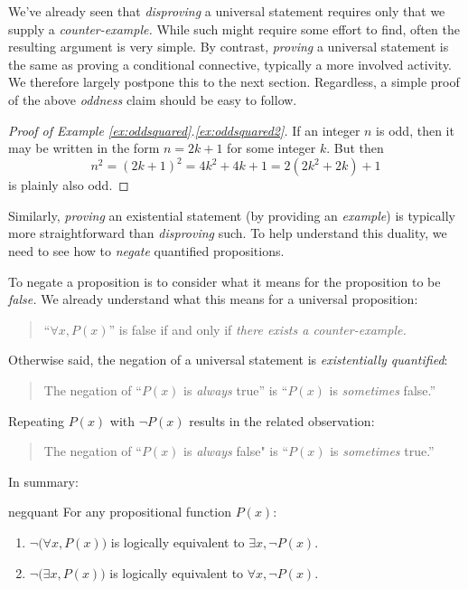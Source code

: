 We've already seen that \emph{disproving} a universal statement requires only that we supply a \emph{counter-example.} While such might require some effort to find, often the resulting argument is very simple. By contrast, \emph{proving} a universal statement is the same as proving a conditional connective, typically a more involved activity. We therefore largely postpone this to the next section. Regardless, a simple proof of the above \emph{oddness} claim should be easy to follow.

\begin{proof}[Proof of Example \ref*{ex:oddsquared}.\ref{ex:oddsquared2}]
	If an integer $n$ is odd, then it may be written in the form $n=2k+1$ for some integer $k$. But then
	\[
		n^2 =(2k+1)^2 =4k^2+4k+1 =2(2k^2+2k)+1
	\]
	is plainly also odd.
\end{proof}

Similarly, \emph{proving} an existential statement (by providing an \emph{example}) is typically more straightforward than \emph{disproving} such. To help understand this duality, we need to see how to \emph{negate} quantified propositions.


\goodbreak



To negate a proposition is to consider what it means for the proposition to be \emph{false.} We already understand what this means for a universal proposition:
\begin{quote}
	``$\forall x,P(x)$'' is false if and only if \emph{there exists a counter-example.}
\end{quote}
Otherwise said, the negation of a universal statement is \emph{existentially quantified}:
\begin{quote}
	The negation of ``$P(x)$ is \emph{always} true'' is ``$P(x)$ is \emph{sometimes} false.''
\end{quote}
Repeating  $P(x)$ with $\neg P(x)$ results in the related observation:
\begin{quote}
	The negation of ``$P(x)$ is \emph{always} false" is ``$P(x)$ is \emph{sometimes} true.''
\end{quote}
In summary:

\begin{thm}{}{negquant}
	For any propositional function $P(x)$:
	\begin{enumerate}
	  \item $\neg\bigl(\forall x, P(x)\bigr)$ is logically equivalent to $\exists x, \neg P(x)$.
	  \item $\neg\bigl(\exists x, P(x)\bigr)$ is logically equivalent to $\forall x, \neg P(x)$.
	\end{enumerate}
\end{thm}


